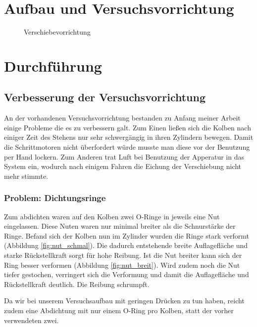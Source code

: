\documentclass[
    11pt,
    ngerman
]{scrreprt}
\begin{document}
\chapter{Aufbau und Versuchsvorrichtung}



\begin{figure}[htbp]
    \centering
    \resizebox{\textwidth}{!}{}
    \caption{%
        Verschiebevorrichtung
    }
    \label{fig:aufbau_total}
\end{figure}


\chapter{Durchführung}

\section{Verbesserung der Versuchsvorrichtung}

An der vorhandenen Versuchsvorrichtung bestanden zu Anfang meiner Arbeit einige
Probleme die es zu verbessern galt. Zum Einen ließen sich die Kolben nach
einiger Zeit des Stehens nur sehr schwergängig in ihren Zylindern bewegen.
Damit die Schrittmotoren nicht überfordert würde musste man diese vor der
Benutzung per Hand lockern. Zum Anderen trat Luft bei Benutzung der Apperatur
in das System ein, wodurch nach einigem Fahren die Eichung der Verschiebung
nicht mehr stimmte.  

\subsection{Problem: Dichtungsringe}

Zum abdichten waren auf den Kolben zwei O-Ringe in jeweils eine Nut
eingelassen. Diese Nuten waren nur minimal breiter als die Schnurstärke der
Ringe. Befand sich der Kolben nun im Zylinder wurden die Ringe stark verformt
(Abbildung \ref{fig:nut_schmal}). Die dadurch entstehende breite Auflagefläche
und starke Rückstellkraft sorgt für hohe Reibung. Ist die Nut breiter kann sich
der Ring besser verformen (Abbildung \ref{fig:nut_breit}). Wird zudem noch die
Nut tiefer gestochen, verringert sich die Verformung und damit die
Auflagefläche und Rückstellkraft deutlich. Die Reibung schrumpft.

Da wir bei unserem Versuchsaufbau mit geringen Drücken zu tun haben, reicht
zudem eine Abdichtung mit nur einem O-Ring pro Kolben, statt der vorher
verwendeten zwei.
\end{document}
